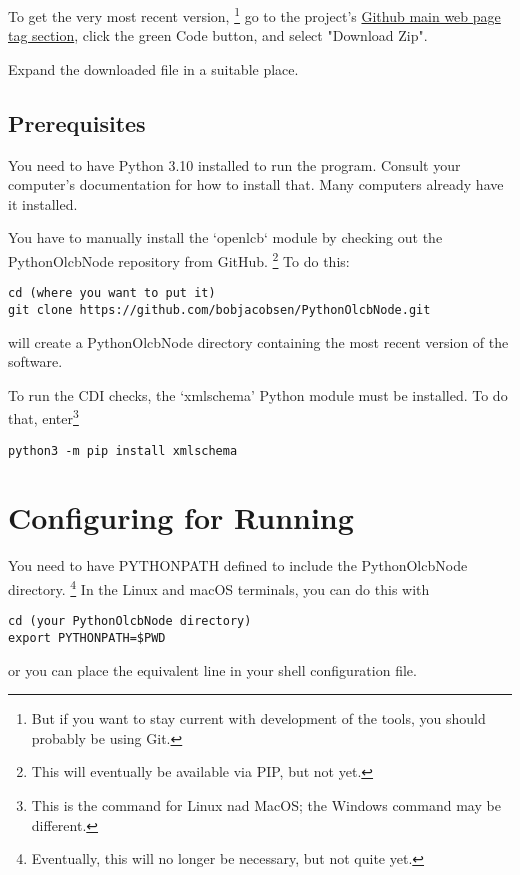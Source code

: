 \documentclass[11pt]{article}
\begin{document}
To get the very most recent version,
\footnote{But if you want to stay current with development of the tools, you should probably be using Git.}
go to the project's
\href{https://github.com/bobjacobsen/OlcbChecker}{Github main web page tag section},
click the green Code button, and select "Download Zip".

Expand the downloaded file in a suitable place.

\subsection{Prerequisites}

You need to have Python 3.10 installed to run the program. Consult your
computer's documentation for how to install that.  Many computers already
have it installed.

You have to manually install the `openlcb` module by checking out the 
PythonOlcbNode repository from GitHub.
\footnote{This will eventually be available via PIP, but not yet.}
To do this:
\begin{verbatim}
cd (where you want to put it)
git clone https://github.com/bobjacobsen/PythonOlcbNode.git
\end{verbatim}
will create a PythonOlcbNode directory containing the most recent version of the software.

To run the CDI checks, the `xmlschema' Python module must be installed. To do that, 
enter\footnote{This is the command for Linux nad MacOS; the Windows command may be different.}

\begin{verbatim}
python3 -m pip install xmlschema
\end{verbatim}

\section{Configuring for Running}

You need to have PYTHONPATH defined to include the PythonOlcbNode directory.
\footnote{Eventually, this will no longer be necessary, but not quite yet.}
In the Linux and macOS
terminals, you can do this with

\begin{verbatim}
cd (your PythonOlcbNode directory)
export PYTHONPATH=$PWD
\end{verbatim}

or you can place the equivalent line in your shell configuration file.
\end{document}
